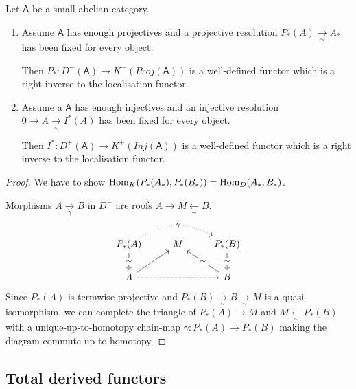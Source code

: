\documentclass[fontsize=11pt,fleqn,a4paper]{scrartcl}
\begin{document}
\begin{lemma}
Let $\mathsf{A}$ be a small abelian category.
\begin{multicols}{2}
\begin{enumerate}
\item Assume $\mathsf{A}$ has enough projectives and a projective resolution $P_\ast(A) \xrightarrow[\sim]{} A_\ast$ has been fixed for every object.

Then $P_\ast: D^-(\mathsf{A}) \to K^-(Proj(\mathsf{A}))$ is a well-defined functor which is a right inverse to the localisation functor.
\item Assume a $\mathsf{A}$ has enough injectives and an injective resolution $0\to A \xrightarrow[\sim]{} I^\ast(A)$ has been fixed for every object.

Then $I^\ast: D^+(\mathsf{A}) \to K^+(Inj(\mathsf{A}))$ is a well-defined functor which is a right inverse to the localisation functor.
\end{enumerate}
\end{multicols}
\end{lemma}
\begin{proof}
We have to show $\operatorname{Hom}_{K}(P_\ast(A_\ast) , P_\ast(B_\ast)) = \operatorname{Hom}_D(A_\ast,B_\ast)$.

Morphisms $A\xrightarrow[\gamma]{} B$ in $D^-$ are roofs $A \to M \xleftarrow[\sim]{} B$.
\[\begin{tikzcd}
P_\ast(A) \ar[rr,dotted,bend left,"\gamma" description] \ar[d,"\sim" description] & M & P_\ast(B) \ar[d,"\sim" description] \\
A \ar[rr,dashed] \ar[ru] && B \ar[lu,"\sim" description]
\end{tikzcd}\]
Since $P_\ast(A)$ is termwise projective and $P_\ast(B) \xrightarrow[\sim]{}B \xrightarrow[\sim]{} M$ is a quasi-isomorphism, we can complete the triangle of $P_\ast(A) \to M$ and $M\xleftarrow[\sim]{} P_\ast(B)$ with a unique-up-to-homotopy chain-map $\gamma: P_\ast(A) \to P_\ast(B)$ making the diagram commute up to homotopy.
\end{proof}

\subsection{Total derived functors}
\end{document}
